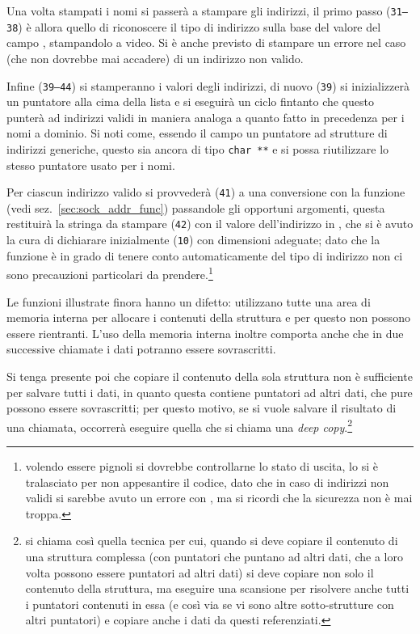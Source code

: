 Una volta stampati i nomi si passerà a stampare gli indirizzi, il primo passo
(\texttt{\small 31--38}) è allora quello di riconoscere il tipo di indirizzo
sulla base del valore del campo , stampandolo a video. Si è
anche previsto di stampare un errore nel caso (che non dovrebbe mai accadere)
di un indirizzo non valido.

Infine (\texttt{\small 39--44}) si stamperanno i valori degli indirizzi, di
nuovo (\texttt{\small 39}) si inizializzerà un puntatore alla cima della lista
e si eseguirà un ciclo fintanto che questo punterà ad indirizzi validi in
maniera analoga a quanto fatto in precedenza per i nomi a dominio. Si noti
come, essendo il campo  un puntatore ad strutture di
indirizzi generiche, questo sia ancora di tipo \texttt{char **} e si possa
riutilizzare lo stesso puntatore usato per i nomi.

Per ciascun indirizzo valido si provvederà (\texttt{\small 41}) a una
conversione con la funzione  (vedi
sez.~\ref{sec:sock_addr_func}) passandole gli opportuni argomenti, questa
restituirà la stringa da stampare (\texttt{\small 42}) con il valore
dell'indirizzo in , che si è avuto la cura di dichiarare
inizialmente (\texttt{\small 10}) con dimensioni adeguate; dato che la
funzione è in grado di tenere conto automaticamente del tipo di indirizzo non
ci sono precauzioni particolari da prendere.\footnote{volendo essere pignoli
  si dovrebbe controllarne lo stato di uscita, lo si è tralasciato per non
  appesantire il codice, dato che in caso di indirizzi non validi si sarebbe
  avuto un errore con , ma si ricordi che la sicurezza non
  è mai troppa.}

Le funzioni illustrate finora hanno un difetto: utilizzano tutte una area di
memoria interna per allocare i contenuti della struttura  e
per questo non possono essere rientranti. L'uso della memoria interna inoltre
comporta anche che in due successive chiamate i dati potranno essere
sovrascritti.

Si tenga presente poi che copiare il contenuto della sola struttura non è
sufficiente per salvare tutti i dati, in quanto questa contiene puntatori ad
altri dati, che pure possono essere sovrascritti; per questo motivo, se si
vuole salvare il risultato di una chiamata, occorrerà eseguire quella che si
chiama una  \textit{deep copy}.\footnote{si chiama così
  quella tecnica per cui, quando si deve copiare il contenuto di una struttura
  complessa (con puntatori che puntano ad altri dati, che a loro volta possono
  essere puntatori ad altri dati) si deve copiare non solo il contenuto della
  struttura, ma eseguire una scansione per risolvere anche tutti i puntatori
  contenuti in essa (e così via se vi sono altre sotto-strutture con altri
  puntatori) e copiare anche i dati da questi referenziati.}

